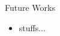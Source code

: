
\begin{frame}{Future Works}
    \begin{itemize}
        \item stuffs...
    \end{itemize}
\end{frame}
